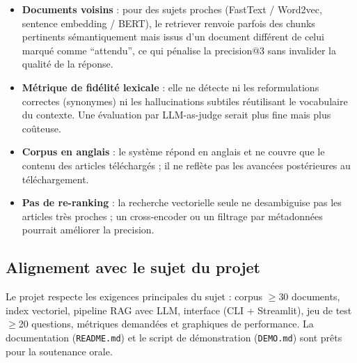 \begin{itemize}
  \item \textbf{Documents voisins} : pour des sujets proches (FastText / Word2vec, sentence
        embedding / BERT), le retriever renvoie parfois des chunks pertinents s\'emantiquement mais
        issus d'un document diff\'erent de celui marqu\'e comme ``attendu'', ce qui p\'enalise la
        precision@3 sans invalider la qualit\'e de la r\'eponse.
  \item \textbf{M\'etrique de fid\'elit\'e lexicale} : elle ne d\'etecte ni les reformulations
        correctes (synonymes) ni les hallucinations subtiles r\'eutilisant le vocabulaire du
        contexte. Une \'evaluation par LLM-as-judge serait plus fine mais plus co\^uteuse.
  \item \textbf{Corpus en anglais} : le syst\`eme r\'epond en anglais et ne couvre que le contenu
        des articles t\'el\'echarg\'es ; il ne refl\`ete pas les avanc\'ees post\'erieures au
        t\'el\'echargement.
  \item \textbf{Pas de re-ranking} : la recherche vectorielle seule ne desambiguise pas les
        articles tr\`es proches ; un cross-encoder ou un filtrage par m\'etadonn\'ees pourrait
        am\'eliorer la precision.
\end{itemize}

\subsection{Alignement avec le sujet du projet}

Le projet respecte les exigences principales du sujet : corpus $\geq$30 documents, index
vectoriel, pipeline RAG avec LLM, interface (CLI + Streamlit), jeu de test $\geq$20 questions,
m\'etriques demand\'ees et graphiques de performance. La documentation
(\texttt{README.md}) et le script de d\'emonstration (\texttt{DEMO.md}) sont pr\^ets pour la
soutenance orale.
